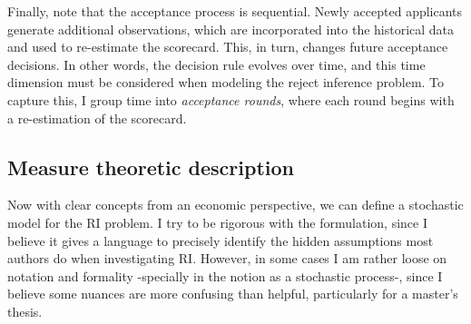 \documentclass[
  12pt,
]{article}
\begin{document}
Finally, note that the acceptance process is sequential. Newly accepted
applicants generate additional observations, which are incorporated into
the historical data and used to re-estimate the scorecard. This, in
turn, changes future acceptance decisions. In other words, the decision
rule evolves over time, and this time dimension must be considered when
modeling the reject inference problem. To capture this, I group time
into \emph{acceptance rounds}, where each round begins with a
re-estimation of the scorecard.

\subsection{Measure theoretic
description}\label{sec-measure-theoretic-desc-ri-problem}

Now with clear concepts from an economic perspective, we can define a
stochastic model for the RI problem. I try to be rigorous with the
formulation, since I believe it gives a language to precisely identify
the hidden assumptions most authors do when investigating RI. However,
in some cases I am rather loose on notation and formality -specially in
the notion as a stochastic process-, since I believe some nuances are
more confusing than helpful, particularly for a master's thesis.
\end{document}
